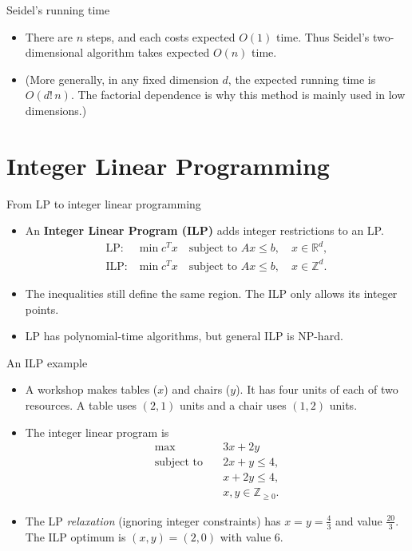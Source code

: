 \documentclass[aspectratio=169]{beamer}
\begin{document}
\begin{frame}{Seidel's running time}
\begin{itemize}[<+->]
\item There are $n$ steps, and each costs expected $O(1)$ time. Thus Seidel's two-dimensional algorithm takes expected $O(n)$ time.
\item (More generally, in any fixed dimension $d$, the expected running time is $O(d!\,n)$. The factorial dependence is why this method is mainly used in low dimensions.)
\end{itemize}
\end{frame}

\section{Integer Linear Programming}
\frame{\sectionpage}
\begin{frame}{From LP to integer linear programming}
\begin{itemize}
\item An \textbf{Integer Linear Program (ILP)} adds integer restrictions to an LP.
\pause
\[
\begin{array}{ll}
\text{LP:} & \min c^Tx\quad\text{subject to }Ax\leq b,\quad x\in\mathbb R^d,\\[0.25cm]
\text{ILP:} & \min c^Tx\quad\text{subject to }Ax\leq b,\quad x\in\mathbb Z^d.
\end{array}
\]
\pause
\item The inequalities still define the same region. The ILP only allows its integer points.
\pause
\item LP has polynomial-time algorithms, but general ILP is NP-hard.
\end{itemize}
\end{frame}
\begin{frame}{An ILP example}
\begin{itemize}[<+->]
\item A workshop makes tables ($x$) and chairs ($y$). It has four units of each of two resources. A table uses $(2,1)$ units and a chair uses $(1,2)$ units.
\item The integer linear program is
\[
\begin{aligned}
\max\quad &3x+2y\\
\text{subject to}\quad &2x+y\leq4,\\
&x+2y\leq4,\\
&x,y\in\mathbb Z_{\geq0}.
\end{aligned}
\]
\item The LP \textit{relaxation} (ignoring integer constraints) has $x=y=\frac43$ and value $\frac{20}{3}$. The ILP optimum is $(x,y)=(2,0)$ with value $6$.
\end{itemize}
\end{frame}
\end{document}
